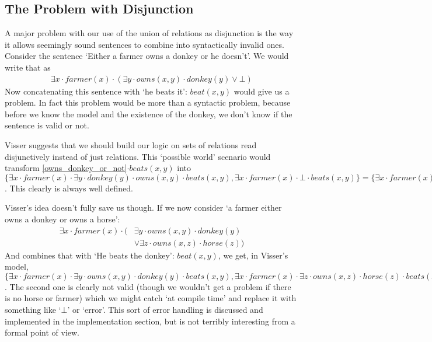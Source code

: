 \documentclass[12pt]{article}
\begin{document}
\subsection{The Problem with Disjunction}\label{sec:problem_disj}


A major problem with our use of the union of relations as disjunction is the way it allows seemingly sound sentences to combine into syntactically invalid ones. Consider the sentence `Either a farmer owns a donkey or he doesn't'. We would write that as
\begin{align}
\exists x\cdot farmer(x)\cdot(\exists y\cdot owns(x,y)\cdot donkey(y)\vee \bot) \label{owns_donkey_or_not}
\end{align}
Now concatenating this sentence with `he beats it': $beat(x,y)$ would give us a problem. In fact this problem would be more than a syntactic problem, because before we know the model and the existence of the donkey, we don't know if the sentence is valid or not.

Visser\cite{visser1999donkey} suggests that we should build our logic on sets of relations read disjunctively instead of just relations. This `possible world' scenario would transform \eqref{owns_donkey_or_not}$\cdot beats(x,y)$ into $\{\exists x\cdot farmer(x)\cdot\exists y\cdot donkey(y)\cdot owns(x,y)\cdot beats(x,y), \exists x\cdot farmer(x)\cdot\bot\cdot beats(x,y)\} = \{\exists x\cdot farmer(x)\cdot\exists y\cdot donkey(y)\cdot owns(x,y)\cdot beats(x,y), \bot\}$. This clearly is always well defined.

Visser's idea doesn't fully save us though. If we now consider `a farmer either owns a donkey or owns a horse':
\begin{align}
\exists x\cdot farmer(x)\cdot(&\exists y\cdot owns(x,y)\cdot donkey(y)\nonumber\\
                              &\vee \exists z\cdot owns(x,z)\cdot horse(z))
\end{align}
And combines that with `He beats the donkey': $beat(x,y)$, we get, in Visser's model, $\{\exists x\cdot farmer(x)\cdot\exists y\cdot owns(x,y)\cdot donkey(y)\cdot beats(x,y), \exists x\cdot farmer(x)\cdot\exists z\cdot owns(x,z)\cdot horse(z)\cdot beats(x,y)\}$. The second one is clearly not valid (though we wouldn't get a problem if there is no horse or farmer) which we might catch `at compile time' and replace it with something like `$\bot$' or `error'. This sort of error handling is discussed and implemented in the implementation section, but is not terribly interesting from a formal point of view.
\end{document}
